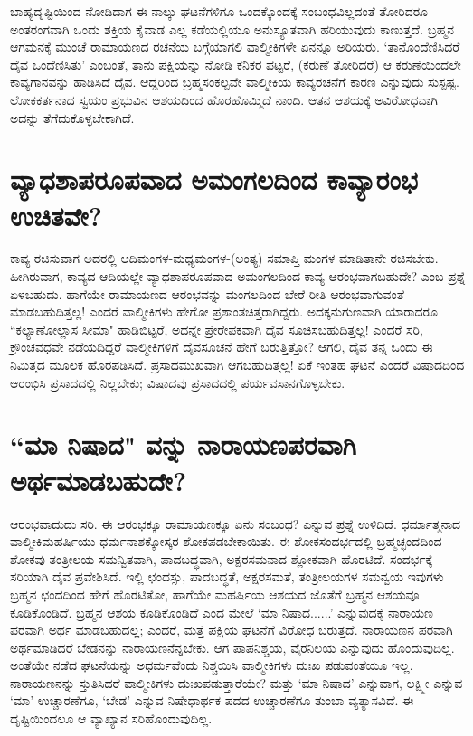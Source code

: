 ಬಾಹ್ಯದೃಷ್ಟಿಯಿಂದ ನೋಡಿದಾಗ ಈ ನಾಲ್ಕು ಘಟನೆಗಳಿಗೂ ಒಂದಕ್ಕೊಂದಕ್ಕೆ ಸಂಬಂಧವಿಲ್ಲದಂತೆ ತೋರಿದರೂ ಅಂತರಂಗವಾಗಿ ಒಂದು ಶಕ್ತಿಯ ಕೈವಾಡ ಎಲ್ಲ ಕಡೆಯಲ್ಲಿಯೂ ಅನುಸ್ಯೂತವಾಗಿ ಹರಿಯುವುದು ಕಾಣುತ್ತದೆ. ಬ್ರಹ್ಮನ ಆಗಮನಕ್ಕೆ ಮುಂಚೆ ರಾಮಾಯಣದ ರಚನೆಯ ಬಗ್ಗೆಯಾಗಲಿ ವಾಲ್ಮೀಕಿಗಳೇ ಏನನ್ನೂ ಅರಿಯರು. `ತಾನೊಂದೆಣಿಸಿದರೆ ದೈವ ಒಂದೆಣಿಸಿತು' ಎಂಬಂತೆ, ತಾನು ಪಕ್ಷಿಯನ್ನು ನೋಡಿ ಕನಿಕರ ಪಟ್ಟರೆ, (ಕರುಣೆ ತೋರಿದರೆ) ಆ ಕರುಣೆಯಿಂದಲೇ ಕಾವ್ಯಗಾನವನ್ನು ಹಾಡಿಸಿದೆ ದೈವ. ಆದ್ದರಿಂದ ಬ್ರಹ್ಮಸಂಕಲ್ಪವೇ ವಾಲ್ಮೀಕಿಯ ಕಾವ್ಯರಚನೆಗೆ ಕಾರಣ ಎನ್ನುವುದು ಸುಸ್ಪಷ್ಟ. ಲೋಕಕರ್ತನಾದ ಸ್ವಯಂ ಪ್ರಭುವಿನ ಆಶಯದಿಂದ ಹೊರಹೊಮ್ಮಿದೆ ನಾಂದಿ. ಆತನ ಆಶಯಕ್ಕೆ ಅವಿರೋಧವಾಗಿ ಅದನ್ನು ತೆಗೆದುಕೊಳ್ಳಬೇಕಾಗಿದೆ. 

\section*{ವ್ಯಾಧಶಾಪರೂಪವಾದ ಅಮಂಗಲದಿಂದ ಕಾವ್ಯಾರಂಭ ಉಚಿತವೇ?} 

ಕಾವ್ಯ ರಚಿಸುವಾಗ ಅದರಲ್ಲಿ ಆದಿಮಂಗಳ-ಮಧ್ಯಮಂಗಳ-(ಅಂತ್ಯ) ಸಮಾಪ್ತಿ ಮಂಗಳ ಮಾಡಿತಾನೇ ರಚಿಸಬೇಕು. ಹೀಗಿರುವಾಗ, ಕಾವ್ಯದ ಆದಿಯಲ್ಲೇ ವ್ಯಾಧಶಾಪರೂಪವಾದ ಅಮಂಗಲದಿಂದ ಕಾವ್ಯ ಆರಂಭವಾಗಬಹುದೇ? ಎಂಬ ಪ್ರಶ್ನೆ ಏಳಬಹುದು. ಹಾಗೆಯೇ ರಾಮಾಯಣದ ಆರಂಭವನ್ನು ಮಂಗಲದಿಂದ ಬೇರೆ ರೀತಿ ಆರಂಭವಾಗುವಂತೆ ಮಾಡಬಹುದಿತ್ತಲ್ಲ! ಎಂದರೆ ವಾಲ್ಮೀಕಿಗಳು ಹೇಗೋ ಪ್ರಶಾಂತಚಿತ್ತರಾಗಿದ್ದರು. ಅದಕ್ಕನುಗುಣವಾಗಿ ಯಾರಾದರೂ ``ಕಲ್ಯಾಣೋಲ್ಲಾಸ ಸೀಮಾ"\label{206} ಹಾಡಿಬಿಟ್ಟರೆ, ಅದನ್ನೇ ಪ್ರೇರೇಪಕವಾಗಿ ದೈವ ಸೂಚಿಸಬಹುದಿತ್ತಲ್ಲ! ಎಂದರೆ ಸರಿ, ಕ್ರೌಂಚವಧವೇ ನಡೆಯದಿದ್ದರೆ ವಾಲ್ಮೀಕಿಗಳಿಗೆ ದೈವಸೂಚನೆ ಹೇಗೆ ಬರುತ್ತಿತ್ತೋ? ಆಗಲಿ, ದೈವ ತನ್ನ ಒಂದು ಈ ನಿಮಿತ್ತದ ಮೂಲಕ ಹೊರಪಡಿಸಿದೆ. ಪ್ರಸಾದಮುಖವಾಗಿ ಆಗಬಹುದಿತ್ತಲ್ಲ! ಏಕೆ ಇಂತಹ ಘಟನೆ ಎಂದರೆ ವಿಷಾದದಿಂದ ಆರಂಭಿಸಿ ಪ್ರಸಾದದಲ್ಲಿ ನಿಲ್ಲಬೇಕು; ವಿಷಾದವು ಪ್ರಸಾದದಲ್ಲಿ ಪರ್ಯವಸಾನಗೊಳ್ಳಬೇಕು. 

\section*{``ಮಾ ನಿಷಾದ" ವನ್ನು ನಾರಾಯಣಪರವಾಗಿ ಅರ್ಥಮಾಡಬಹುದೇ?} 

ಆರಂಭವಾದುದು ಸರಿ. ಈ ಆರಂಭಕ್ಕೂ ರಾಮಾಯಣಕ್ಕೂ ಏನು ಸಂಬಂಧ? ಎನ್ನುವ ಪ್ರಶ್ನೆ ಉಳಿದಿದೆ. ಧರ್ಮಾತ್ಮನಾದ ವಾಲ್ಮೀಕಿಮಹರ್ಷಿಯು ಧರ್ಮನಾಶಕ್ಕೋಸ್ಕರ ಶೋಕಪಡಬೇಕಾಯಿತು. ಈ ಶೋಕಸಂದರ್ಭದಲ್ಲಿ ಬ್ರಹ್ಮಚ್ಛಂದದಿಂದ ಶೋಕವು ತಂತ್ರೀಲಯ ಸಮನ್ವಿತವಾಗಿ, ಪಾದಬದ್ಧವಾಗಿ, ಅಕ್ಷರಸಮನಾದ ಶ್ಲೋಕವಾಗಿ ಹೊರಟಿದೆ. ಸಂದರ್ಭಕ್ಕೆ ಸರಿಯಾಗಿ ದೈವ ಪ್ರವೇಶಿಸಿದೆ. ಇಲ್ಲಿ ಛಂದಸ್ಸು, ಪಾದಬದ್ಧತೆ, ಅಕ್ಷರಸಮತೆ, ತಂತ್ರೀಲಯಗಳ ಸಮನ್ವಯ ಇವುಗಳು ಬ್ರಹ್ಮನ ಛಂದದಿಂದ ಹೇಗೆ ಹೊರಟಿತೋ, ಹಾಗೆಯೇ ಮಹರ್ಷಿಯ ಆಶಯದ ಜೊತೆಗೆ ಬ್ರಹ್ಮನ ಆಶಯವೂ ಕೂಡಿಕೊಂಡಿದೆ. ಬ್ರಹ್ಮನ ಆಶಯ ಕೂಡಿಕೊಂಡಿದೆ ಎಂದ ಮೇಲೆ `ಮಾ ನಿಷಾದ......' ಎನ್ನುವುದಕ್ಕೆ ನಾರಾಯಣ ಪರವಾಗಿ ಅರ್ಥ ಮಾಡಬಹುದಲ್ಲ; ಎಂದರೆ, ಮತ್ತೆ ಪಕ್ಷಿಯ ಘಟನೆಗೆ ವಿರೋಧ ಬರುತ್ತದೆ. ನಾರಾಯಣನ ಪರವಾಗಿ ಅರ್ಥಮಾಡಿದರೆ ಬೇಡನನ್ನು ನಾರಾಯಣನೆನ್ನಬೇಕು. ಆಗ ಪಾಪನಿಶ್ಚಯ, ವೈರನಿಲಯ ಎನ್ನುವುದು ಹೊಂದುವುದಿಲ್ಲ. ಅಂತೆಯೇ ನಡೆದ ಘಟನೆಯನ್ನು ಅಧರ್ಮವೆಂದು ನಿಶ್ಚಯಿಸಿ ವಾಲ್ಮೀಕಿಗಳು ದುಃಖ ಪಡುವಂತೆಯೂ ಇಲ್ಲ. ನಾರಾಯಣನನ್ನು ಸ್ತುತಿಸಿದರೆ ವಾಲ್ಮೀಕಿಗಳು ದುಃಖಪಡುತ್ತಾರೆಯೇ? ಮತ್ತು `ಮಾ ನಿಷಾದ' ಎನ್ನುವಾಗ, ಲಕ್ಷ್ಮೀ ಎನ್ನುವ `ಮಾ' ಉಚ್ಚಾರಣೆಗೂ, `ಬೇಡ' ಎನ್ನುವ ನಿಷೇಧಾರ್ಥಕ ಪದದ ಉಚ್ಚಾರಣೆಗೂ ತುಂಬಾ ವ್ಯತ್ಯಾಸವಿದೆ. ಈ ದೃಷ್ಟಿಯಿಂದಲೂ ಆ ವ್ಯಾಖ್ಯಾನ ಸರಿಹೊಂದುವುದಿಲ್ಲ. 

